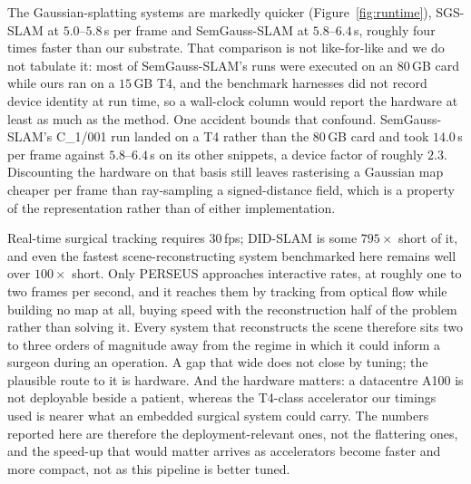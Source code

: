 \documentclass{article}
\begin{document}
The Gaussian-splatting systems are markedly quicker (Figure~\ref{fig:runtime}), SGS-SLAM at $5.0$--$5.8$\,s per frame and SemGauss-SLAM at $5.8$--$6.4$\,s, roughly four times faster than our substrate. That comparison is not like-for-like and we do not tabulate it: most of SemGauss-SLAM's runs were executed on an $80$\,GB card while ours ran on a $15$\,GB T4, and the benchmark harnesses did not record device identity at run time, so a wall-clock column would report the hardware at least as much as the method. One accident bounds that confound. SemGauss-SLAM's C\_1/001 run landed on a T4 rather than the $80$\,GB card and took $14.0$\,s per frame against $5.8$--$6.4$\,s on its other snippets, a device factor of roughly $2.3$. Discounting the hardware on that basis still leaves rasterising a Gaussian map cheaper per frame than ray-sampling a signed-distance field, which is a property of the representation rather than of either implementation.

Real-time surgical tracking requires $30$\,fps; DID-SLAM is some $795\times$ short of it, and even the fastest scene-reconstructing system benchmarked here remains well over $100\times$ short. Only PERSEUS approaches interactive rates, at roughly one to two frames per second, and it reaches them by tracking from optical flow while building no map at all, buying speed with the reconstruction half of the problem rather than solving it. Every system that reconstructs the scene therefore sits two to three orders of magnitude away from the regime in which it could inform a surgeon during an operation. A gap that wide does not close by tuning; the plausible route to it is hardware. And the hardware matters: a datacentre A100 is not deployable beside a patient, whereas the T4-class accelerator our timings used is nearer what an embedded surgical system could carry. The numbers reported here are therefore the deployment-relevant ones, not the flattering ones, and the speed-up that would matter arrives as accelerators become faster and more compact, not as this pipeline is better tuned.
\end{document}
